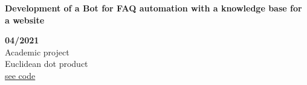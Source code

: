 \begin{minipage}{0.8\textwidth}
    \parbox{0.8\linewidth}{\textbf{Development of a Bot for FAQ automation with a knowledge base for a website}} \hfill \textbf{04/2021}\\
    Academic project\\
    Euclidean dot product\\
    \href{https://github.com/JavierOramas/FAQ-Chat-Bot-Nous}{see code}\\
    \end{minipage} \hfill {}\\\\
    